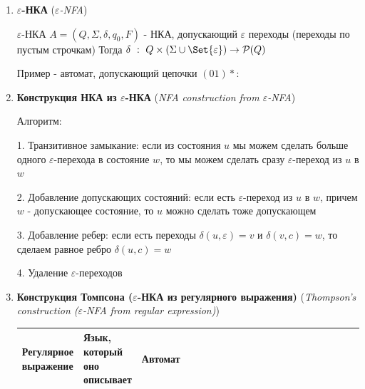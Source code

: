 \documentclass[12pt]{article}
\begin{document}
\begin{enumerate}
        \item \textbf{$\varepsilon$-НКА} (\textit{$\varepsilon$-NFA})

        $\varepsilon$-НКА $A = (Q, \Sigma, \delta, q_0, F)$ - НКА, допускающий $\varepsilon$ переходы (переходы по пустым строчкам)
        Тогда $\delta \ : \ Q \times (\Sigma \union \Set{\varepsilon}) \to \mathcal{P}(Q)$

        Пример - автомат, допускающий цепочки $(01)*$:


        \item \textbf{Конструкция НКА из $\varepsilon$-НКА} (\textit{NFA construction from $\varepsilon$-NFA})

        Алгоритм:

        1. Транзитивное замыкание: если из состояния $u$ мы можем сделать больше одного $\varepsilon$-перехода в состояние $w$, то мы можем сделать сразу $\varepsilon$-переход из $u$ в $w$

        2. Добавление допускающих состояний: если есть $\varepsilon$-переход из $u$ в $w$, причем $w$ - допускающее состояние, то $u$ можно сделать тоже допускающем

        3. Добавление ребер: если есть переходы $\delta(u, \varepsilon) = v$ и $\delta(v, c) = w$, то сделаем равное ребро $\delta(u, c) = w$

        4. Удаление $\varepsilon$-переходов

        \item \textbf{Конструкция Томпсона ($\varepsilon$-НКА из регулярного выражения)} (\textit{Thompson’s construction ($\varepsilon$-NFA from regular expression)})


        \begin{tabular}{m{0.12\linewidth}|m{0.12\linewidth}|m{0.76\linewidth}}
            Регулярное выражение & Язык, который оно описывает & Автомат \\
            \hline


\end{tabular}
\end{enumerate}
\end{document}
